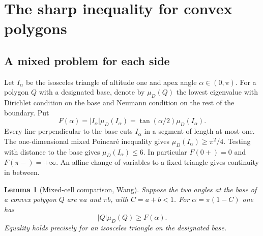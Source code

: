 \documentclass[11pt,a4paper,reqno]{amsart}
\newtheorem{lemma}[theorem]{Lemma}
\theoremstyle{remark}
\numberwithin{equation}{section}
\begin{document}
\tableofcontents

\section{The sharp inequality for convex polygons}\label{sec:angles}
\subsection{A mixed problem for each side}\label{sec:cell}

Let $I_\alpha$ be the isosceles triangle of altitude one and apex angle
$\alpha\in(0,\pi)$. For a polygon $Q$ with a designated base, denote by
$\mu_D(Q)$ the lowest eigenvalue with Dirichlet condition on the base and
Neumann condition on the rest of the boundary. Put
\[
 F(\alpha)=|I_\alpha|\mu_D(I_\alpha)=\tan(\alpha/2)\mu_D(I_\alpha).
\]
Every line perpendicular to the base cuts $I_\alpha$ in a segment of length
at most one. The one-dimensional mixed Poincar\'e inequality gives
$\mu_D(I_\alpha)\ge\pi^2/4$. Testing with distance to the base gives
$\mu_D(I_\alpha)\le6$. In particular $F(0+)=0$ and $F(\pi-)=+\infty$.
An affine change of variables to a fixed triangle gives continuity in between.

\begin{lemma}[Mixed-cell comparison, Wang]\label{lem:cell}
Suppose the two angles at the base of a convex polygon $Q$ are $\pi a$ and
$\pi b$, with $C=a+b<1$. For $\alpha=\pi(1-C)$ one has
\[
                   |Q|\mu_D(Q)\ge F(\alpha).
\]
Equality holds precisely for an isosceles triangle on the designated base.
\end{lemma}
\end{document}
